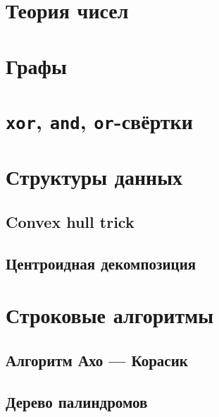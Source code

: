 \documentclass[a4paper,twocolumn,8pt]{extarticle}
\begin{document}
    \pagestyle{fancy}
    \tableofcontents
    \newpage
    \section{Теория чисел}
    
    
    

    \section{Графы}
    
    
    

    \section{\texttt{xor}, \texttt{and}, \texttt{or}-свёртки}
    

    \section{Структуры данных}
    
    
    
    \subsection{Convex hull trick}
    
    \subsection{Центроидная декомпозиция}
    

    \section{Строковые алгоритмы}
    
    
    
    
    \subsection{Алгоритм Ахо --- Корасик}
    
    \subsection{Дерево палиндромов}
    
\end{document}
